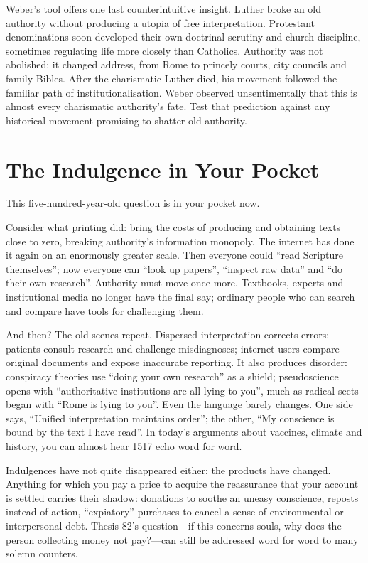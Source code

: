 Weber's tool offers one last counterintuitive insight. Luther broke an old authority without producing a utopia of free interpretation. Protestant denominations soon developed their own doctrinal scrutiny and church discipline, sometimes regulating life more closely than Catholics. Authority was not abolished; it changed address, from Rome to princely courts, city councils and family Bibles. After the charismatic Luther died, his movement followed the familiar path of institutionalisation. Weber observed unsentimentally that this is almost every charismatic authority's fate. Test that prediction against any historical movement promising to shatter old authority.

\section{The Indulgence in Your Pocket}
This five-hundred-year-old question is in your pocket now.

Consider what printing did: bring the costs of producing and obtaining texts close to zero, breaking authority's information monopoly. The internet has done it again on an enormously greater scale. Then everyone could ``read Scripture themselves''; now everyone can ``look up papers'', ``inspect raw data'' and ``do their own research''. Authority must move once more. Textbooks, experts and institutional media no longer have the final say; ordinary people who can search and compare have tools for challenging them.

And then? The old scenes repeat. Dispersed interpretation corrects errors: patients consult research and challenge misdiagnoses; internet users compare original documents and expose inaccurate reporting. It also produces disorder: conspiracy theories use ``doing your own research'' as a shield; pseudoscience opens with ``authoritative institutions are all lying to you'', much as radical sects began with ``Rome is lying to you''. Even the language barely changes. One side says, ``Unified interpretation maintains order''; the other, ``My conscience is bound by the text I have read''. In today's arguments about vaccines, climate and history, you can almost hear 1517 echo word for word.

Indulgences have not quite disappeared either; the products have changed. Anything for which you pay a price to acquire the reassurance that your account is settled carries their shadow: donations to soothe an uneasy conscience, reposts instead of action, ``expiatory'' purchases to cancel a sense of environmental or interpersonal debt. Thesis 82's question---if this concerns souls, why does the person collecting money not pay?---can still be addressed word for word to many solemn counters.

